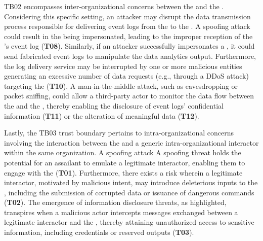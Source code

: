 \begin{newj}
TB02  encompasses inter-organizational concerns between the  and the . Considering this specific setting, an attacker may disrupt the data transmission process responsible for delivering event logs from the  to the . A spoofing attack could result in the  being impersonated, leading to the improper reception of the 's event log (\textbf{T08}). Similarly, if an attacker successfully impersonates a , it could send fabricated event logs to manipulate the data analytics output. Furthermore, the log delivery service may be interrupted by one or more malicious entities generating an excessive number of data requests (e.g., through a DDoS attack) targeting the  (\textbf{T10}). A man-in-the-middle attack, such as eavesdropping or packet sniffing, could allow a third-party actor to monitor the data flow between the  and the , thereby enabling the disclosure of event logs' confidential information (\textbf{T11}) or the alteration of meaningful data (\textbf{T12}).

Lastly, the TB03 trust boundary pertains to intra-organizational concerns involving the interaction between the  and a generic intra-organizational interactor within the same organization. A spoofing attack  A spoofing threat holds the potential for an assailant to emulate a legitimate interactor, enabling them to engage with the  (\textbf{T01}).%
Furthermore, there exists a risk wherein a legitimate interactor, motivated by malicious intent, may introduce deleterious inputs to the , including the submission of corrupted data or issuance of dangerous commands (\textbf{T02}). The emergence of information disclosure threats, as highlighted, transpires when a malicious actor intercepts messages exchanged between a legitimate interactor and the , thereby attaining unauthorized access to sensitive information, including credentials or reserved outputs (\textbf{T03}).
\end{newj}


